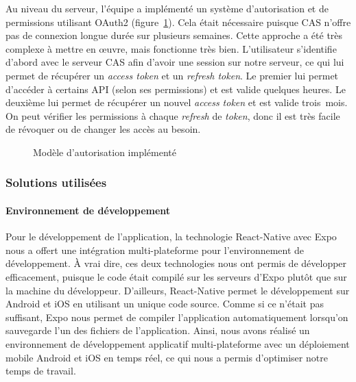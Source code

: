         Au niveau du serveur, l'équipe a implémenté un système d'autorisation et de permissions utilisant OAuth2 (figure~\ref{fig.modeleAutorisation}). Cela était nécessaire puisque CAS n'offre pas de connexion longue durée sur plusieurs semaines. Cette approche a été très complexe à mettre en \oe{}uvre, mais fonctionne très bien. L'utilisateur s'identifie d'abord avec le serveur CAS afin d'avoir une session sur notre serveur, ce qui lui permet de récupérer un \emph{access token} et un \emph{refresh token}. Le premier lui permet d'accéder à certains API (selon ses permissions) et est valide quelques heures. Le deuxième lui permet de récupérer un nouvel \emph{access token} et est valide trois~mois. On peut vérifier les permissions à chaque \emph{refresh} de \emph{token}, donc il est très facile de révoquer ou de changer les accès au besoin.
    
        \begin{figure}[hp] \centering
            
            \caption{Modèle d'autorisation implémenté}
            \label{fig.modeleAutorisation}
        \end{figure}  

        \subsubsection{Solutions utilisées}
        \paragraph{Environnement de développement}
        Pour le développement de l'application, la technologie React-Native avec Expo nous a offert une intégration multi-plateforme pour l'environnement de développement. À vrai dire, ces deux technologies nous ont permis de développer efficacement, puisque le code était compilé sur les serveurs d'Expo plutôt que sur la machine du développeur. D'ailleurs, React-Native permet le développement sur Android et iOS en utilisant un unique code source. Comme si ce n'était pas suffisant, Expo nous permet de compiler l'application automatiquement lorsqu'on sauvegarde l'un des fichiers de l'application. Ainsi, nous avons réalisé un environnement de développement applicatif multi-plateforme avec un déploiement mobile Android et iOS en temps réel, ce qui nous a permis d'optimiser notre temps de travail.
        
